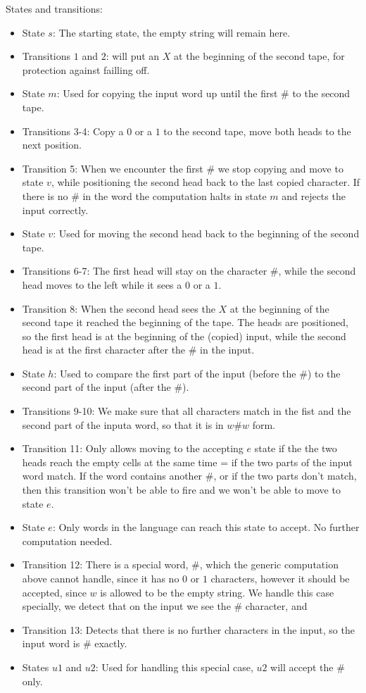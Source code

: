 States and transitions:
\begin{itemize}
    \item State $s$: The starting state, the empty string will remain here.
    \item Transitions $1$ and $2$: will put an $X$ at the beginning of the second tape, for protection against failling off.
    \item State $m$: Used for copying the input word up until the first $\#$ to the second tape.
    \item Transitions 3-4: Copy a $0$ or a $1$ to the second tape, move both heads to the next position.
    \item Transition 5: When we encounter the first $\#$ we stop copying and move to state $v$, while positioning the second head back to the last copied character. If there is no $\#$ in the word the computation halts in state $m$ and rejects the input correctly.
    \item State $v$: Used for moving the second head back to the beginning of the second tape.
    \item Transitions 6-7: The first head will stay on the character $\#$, while the second head moves to the left while it sees a $0$ or a $1$.
    \item Transition 8: When the second head sees the $X$ at the beginning of the second tape it reached the beginning of the tape. The heads are positioned, so the first head is at the beginning of the (copied) input, while the second head is at the first character after the $\#$ in the input.
    \item State $h$: Used to compare the first part of the input (before the $\#$) to the second part of the input (after the $\#$).
    \item Transitions 9-10: We make sure that all characters match in the fist and the second part of the inputa word, so that it is in $w\#w$ form.
    \item Transition 11: Only allows moving to the accepting $e$ state if the the two heads reach the empty cells at the same time = if the two parts of the input word match. If the word contains another $\#$, or if the two parts don't match, then this transition won't be able to fire and we won't be able to move to state $e$.
    \item State $e$: Only words in the language can reach this state to accept. No further computation needed.
    \item Transition 12: There is a special word, $\#$, which the generic computation above cannot handle, since it has no $0$ or $1$ characters, however it should be accepted, since $w$ is allowed to be the empty string. We handle this case specially, we detect that on the input we see the $\#$ character, and
    \item Transition 13: Detects that there is no further characters in the input, so the input word is $\#$ exactly.
    \item States $u1$ and $u2$: Used for handling this special case, $u2$ will accept the $\#$ only.
\end{itemize}


